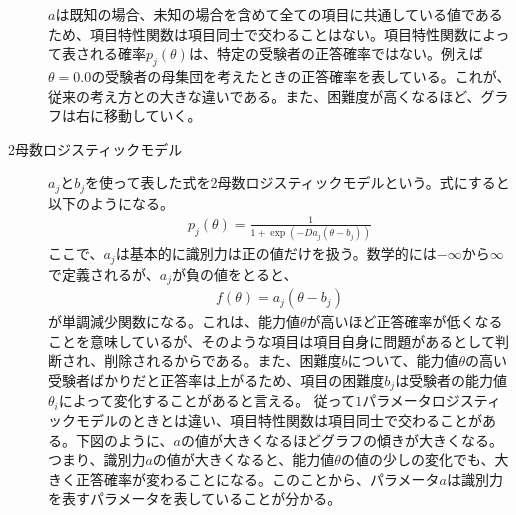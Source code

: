 \documentclass[12pt]{jarticle}
\numberwithin{equation}{subsection}
\begin{document}
\begin{description}
$a$は既知の場合、未知の場合を含めて全ての項目に共通している値であるため、項目特性関数は項目同士で交わることはない。項目特性関数によって表される確率$p_j(\theta)$は、特定の受験者の正答確率ではない。例えば$\theta = 0.0$の受験者の母集団を考えたときの正答確率を表している。これが、従来の考え方との大きな違いである。また、困難度が高くなるほど、グラフは右に移動していく。
  \item[2母数ロジスティックモデル] $a_j$と$b_j$を使って表した式を2母数ロジスティックモデルという。式にすると以下のようになる。
  \begin{align}
    \label{03}
    \displaystyle p_j(\theta) = \frac{1}{1+\exp(-Da_j(\theta - b_j))}
  \end{align}
  ここで、$a_j$は基本的に識別力は正の値だけを扱う。数学的には$-\infty$から$\infty$で定義されるが、$a_j$が負の値をとると、
  \begin{align}
    \displaystyle f(\theta) = a_j(\theta - b_{j})
  \end{align}
  が単調減少関数になる。これは、能力値$\theta$が高いほど正答確率が低くなることを意味しているが、そのような項目は項目自身に問題があるとして判断され、削除されるからである。また、困難度$b$について、能力値$\theta$の高い受験者ばかりだと正答率は上がるため、項目の困難度$b_j$は受験者の能力値$\theta_i$によって変化することがあると言える。
  従って$1$パラメータロジスティックモデルのときとは違い、項目特性関数は項目同士で交わることがある。下図のように、$a$の値が大きくなるほどグラフの傾きが大きくなる。つまり、識別力$a$の値が大きくなると、能力値$\theta$の値の少しの変化でも、大きく正答確率が変わることになる。このことから、パラメータ$a$は識別力を表すパラメータを表していることが分かる。
  \vspace{4cm}
  \begin{figure}[H]
    \centering

\end{figure}
\end{description}
\end{document}
